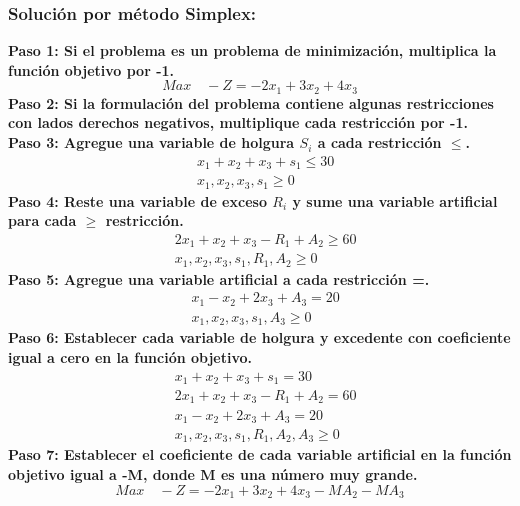 \documentclass{templateNote}
\begin{document}
\subsubsection*{Solución por método Simplex:}
\noindent
\textbf{Paso 1: Si el problema es un problema de minimización, multiplica la función objetivo por -1.}
\begin{equation*}
    Max \quad -Z = -2x_1 + 3x_2 + 4x_3
\end{equation*}
\textbf{Paso 2: Si la formulación del problema contiene algunas restricciones con lados derechos negativos, multiplique cada restricción por -1.}
\\
\textbf{Paso 3: Agregue una variable de holgura $S_i$ a cada restricción $\leq$.}
\begin{equation*}
    \begin{aligned}
        & x_1 + x_2 + x_3 + s_1 \leq 30 \\
        & x_1, x_2, x_3, s_1 \geq 0
    \end{aligned}
\end{equation*}
\textbf{Paso 4: Reste una variable de exceso $R_i$ y sume una variable artificial para cada $\geq$ restricción.}
\begin{equation*}
    \begin{aligned}
        & 2x_1 + x_2 + x_3 - R_1 + A_2 \geq 60 \\
        & x_1, x_2, x_3, s_1, R_1, A_2 \geq 0
    \end{aligned}
\end{equation*}
\textbf{Paso 5: Agregue una variable artificial a cada restricción =.}
\begin{equation*}
    \begin{aligned}
        & x_1 - x_2 + 2x_3 + A_3 = 20 \\
        & x_1, x_2, x_3, s_1, A_3 \geq 0
    \end{aligned}
\end{equation*}
\textbf{Paso 6: Establecer cada variable de holgura y excedente con coeficiente igual a cero en la función objetivo.}
\begin{equation*}
    \begin{aligned}
        & x_1 + x_2 + x_3 + s_1 = 30 \\
        & 2x_1 + x_2 + x_3 - R_1 + A_2 = 60 \\
        & x_1 - x_2 + 2x_3 + A_3= 20 \\
        & x_1, x_2, x_3, s_1, R_1, A_2, A_3 \geq 0
    \end{aligned}
\end{equation*}
\textbf{Paso 7: Establecer el coeficiente de cada variable artificial en la función objetivo igual a -M, donde M es una número muy grande.}
\begin{equation*}
    Max \quad -Z = -2x_1 + 3x_2 + 4x_3 - MA_2 - MA_3
\end{equation*}
\end{document}
